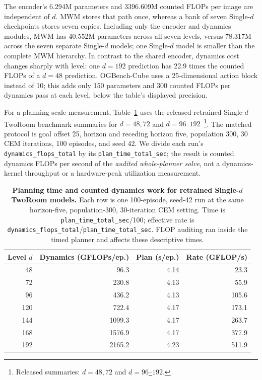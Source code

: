 The encoder's 6.294M parameters and 3396.609M counted FLOPs per image are independent of $d$. MWM stores that path once, whereas a bank of seven Single-\(d\) checkpoints stores seven copies. Including only the encoder and dynamics modules, MWM has 40.552M parameters across all seven levels, versus 78.317M across the seven separate Single-\(d\) models; one Single-\(d\) model is smaller than the complete MWM hierarchy. In contrast to the shared encoder, dynamics cost changes sharply with level: one $d=192$ prediction has 22.9 times the counted FLOPs of a $d=48$ prediction. OGBench-Cube uses a 25-dimensional action block instead of 10; this adds only 150 parameters and 300 counted FLOPs per dynamics pass at each level, below the table's displayed precision.

For a planning-scale measurement, Table~\ref{tab:retrained_individual_plan_throughput} uses the released retrained Single-\(d\) TwoRoom benchmark summaries for $d=48,72$ and $d=96$--$192$~\footnote{Released summaries: \href{https://github.com/ethayu/HUDM/blob/multienv-support/reports/shared/individual_vs_dense_matched_k_horizon5_iter30_all_envs/data/tworoom_individual_k48_72_summary.json}{$d=48,72$} and \href{https://github.com/ethayu/HUDM/blob/multienv-support/reports/shared/individual_vs_dense_matched_k_horizon5_iter30_all_envs/data/tworoom_individual_new_k96_192_summary.json}{$d=96$--$192$}.}. The matched protocol is goal offset 25, horizon and receding horizon five, population 300, 30 CEM iterations, 100 episodes, and seed 42. We divide each run's \texttt{dynamics\_flops\_total} by its \texttt{plan\_time\_total\_sec}; the result is counted dynamics FLOPs per second of the \emph{audited whole-planner solve}, not a dynamics-kernel throughput or a hardware-peak utilization measurement.

\begin{table}[t]
    \centering
    \caption{\textbf{Planning time and counted dynamics work for retrained Single-\(d\) TwoRoom models.} Each row is one 100-episode, seed-42 run at the same horizon-five, population-300, 30-iteration CEM setting. Time is \texttt{plan\_time\_total\_sec}/100; effective rate is \texttt{dynamics\_flops\_total}/\texttt{plan\_time\_total\_sec}. FLOP auditing ran inside the timed planner and affects these descriptive times.}
    \label{tab:retrained_individual_plan_throughput}
    {\small
    \begin{tabular}{@{}rrrr@{}}
        \toprule
        Level $d$ & Dynamics (GFLOPs/ep.) & Plan (s/ep.) & Rate (GFLOP/s) \\
        \midrule
        48 & 96.3 & 4.14 & 23.3 \\
        72 & 230.8 & 4.13 & 55.9 \\
        96 & 436.2 & 4.13 & 105.6 \\
        120 & 722.4 & 4.17 & 173.1 \\
        144 & 1099.3 & 4.17 & 263.7 \\
        168 & 1576.9 & 4.17 & 377.9 \\
        192 & 2165.2 & 4.23 & 511.9 \\
        \bottomrule
    \end{tabular}
    }
\end{table}
\FloatBarrier

